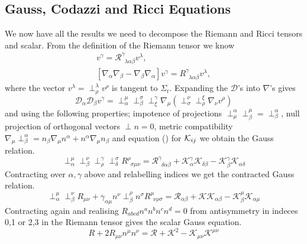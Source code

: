 \subsection{Gauss, Codazzi and Ricci Equations}
We now have all the results we need to decompose the Riemann and Ricci tensors and scalar. From the definition of the Riemann tensor we know
\begin{gather*} [\mathcal{D}_\alpha\mathcal{D}_\beta-\mathcal{D}_\beta\mathcal{D}_\alpha]v^\gamma = \mathcal{R}^\gamma_{\,\,\,\lambda \alpha\beta}v^\lambda, \\
 [\nabla_\alpha\nabla_\beta-\nabla_\beta\nabla_\alpha]v^\gamma = {R}^\gamma_{\,\,\,\lambda \alpha\beta}v^\lambda, \end{gather*}
where the vector $v^\lambda = \perp^\lambda_\rho v^\rho$ is tangent to $\Sigma_t$. Expanding the $\mathcal{D}$'s into $\nabla$'s gives
\begin{equation} \mathcal{D}_\alpha \mathcal{D}_\beta v^\gamma = \perp^\mu_\alpha \perp_\beta^\sigma \perp^\gamma_\xi \nabla_\mu(\perp^\nu_\sigma \perp^\xi_\rho \nabla_\nu v^\rho)\end{equation}
and using the following properties; impotence of projections $\perp^\alpha_\mu \perp^\mu_\beta = \perp^\alpha_\beta$, null projection of orthogonal vectors $\perp n =0$, metric compatibility $\nabla_\mu \perp^\alpha_\beta = n_\beta\nabla_\mu n^\alpha + n^\alpha \nabla_\mu n_\beta$ and equation () for $\mathcal{K}_{ij}$ we obtain the Gauss relation.
\begin{equation} \perp^\mu_\alpha \perp^\nu_\beta \perp^\gamma_\rho \perp^\sigma_\delta R^{\rho}_{\,\,\,\sigma\mu\nu} = \mathcal{R}^\gamma_{\,\,\,\delta\alpha\beta} + \mathcal{K}^\gamma_\alpha \mathcal{K}_{\delta\beta} - \mathcal{K}^\gamma_\beta \mathcal{K}_{\alpha\delta}  \end{equation}
Contracting over $\alpha,\gamma$ above and relabelling indices we get the contracted Gauss relation.
\begin{equation} \perp^\mu_\alpha \perp^\nu_\beta R_{\mu\nu} + \gamma_{\alpha\mu}n^\nu\perp^\rho_\beta n^\sigma R^\mu_{\,\,\,\nu\rho\sigma} = \mathcal{R}_{\alpha\beta} + \mathcal{K} \mathcal{K}_{\alpha\beta} - \mathcal{K}^\mu_\beta \mathcal{K}_{\alpha\mu}  \end{equation}
Contracting again and realising $R_{abcd}n^an^bn^cn^d=0$ from antisymmetry in indeces 0,1 or 2,3 in the Riemann tensor gives the scalar Gauss equation.
\begin{equation}R + 2R_{\mu\nu}n^\mu n^\nu = \mathcal{R} + \mathcal{K}^2 - \mathcal{K}_{\mu\nu}\mathcal{K}^{\mu\nu}\end{equation}
